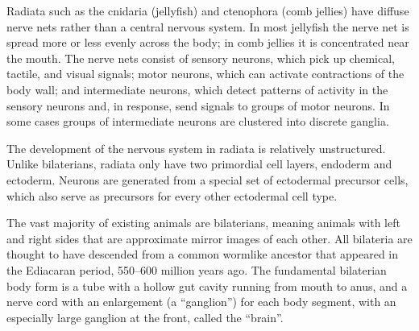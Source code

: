 Radiata such as the cnidaria (jellyfish) and ctenophora (comb jellies) have diffuse nerve nets rather than a central nervous system. In most jellyfish the nerve net is spread more or less evenly across the body; in comb jellies it is concentrated near the mouth. The nerve nets consist of sensory neurons, which pick up chemical, tactile, and visual signals; motor neurons, which can activate contractions of the body wall; and intermediate neurons, which detect patterns of activity in the sensory neurons and, in response, send signals to groups of motor neurons. In some cases groups of intermediate neurons are clustered into discrete ganglia.

The development of the nervous system in radiata is relatively unstructured. Unlike bilaterians, radiata only have two primordial cell layers, endoderm and ectoderm. Neurons are generated from a special set of ectodermal precursor cells, which also serve as precursors for every other ectodermal cell type.

The vast majority of existing animals are bilaterians, meaning animals with left and right sides that are approximate mirror images of each other. All bilateria are thought to have descended from a common wormlike ancestor that appeared in the Ediacaran period, 550--600 million years ago. The fundamental bilaterian body form is a tube with a hollow gut cavity running from mouth to anus, and a nerve cord with an enlargement (a ``ganglion'') for each body segment, with an especially large ganglion at the front, called the ``brain''.



